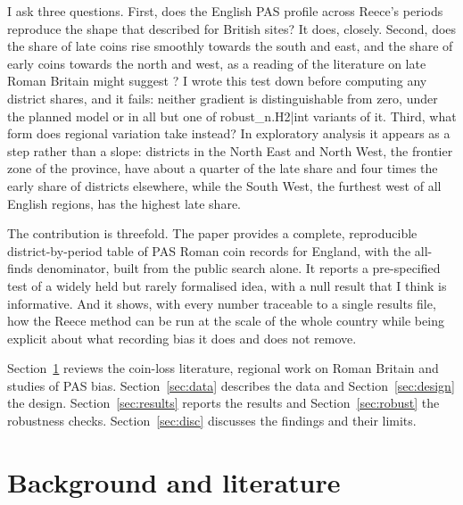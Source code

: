 \documentclass[11pt,a4paper]{article}
\begin{document}
I ask three questions. First, does the English PAS profile across Reece's periods reproduce the shape that \citet{reece1995} described for British sites? It does, closely. Second, does the share of late coins rise smoothly towards the south and east, and the share of early coins towards the north and west, as a reading of the literature on late Roman Britain might suggest \citep{esmondecleary1989,walton2012,walton2016}? I wrote this test down before computing any district shares, and it fails: neither gradient is distinguishable from zero, under the planned model or in all but one of {{robust_n.H2|int}} variants of it. Third, what form does regional variation take instead? In exploratory analysis it appears as a step rather than a slope: districts in the North East and North West, the frontier zone of the province, have about a quarter of the late share and four times the early share of districts elsewhere, while the South West, the furthest west of all English regions, has the highest late share.

The contribution is threefold. The paper provides a complete, reproducible district-by-period table of PAS Roman coin records for England, with the all-finds denominator, built from the public search alone. It reports a pre-specified test of a widely held but rarely formalised idea, with a null result that I think is informative. And it shows, with every number traceable to a single results file, how the Reece method can be run at the scale of the whole country while being explicit about what recording bias it does and does not remove.

Section~\ref{sec:lit} reviews the coin-loss literature, regional work on Roman Britain and studies of PAS bias. Section~\ref{sec:data} describes the data and Section~\ref{sec:design} the design. Section~\ref{sec:results} reports the results and Section~\ref{sec:robust} the robustness checks. Section~\ref{sec:disc} discusses the findings and their limits.

\section{Background and literature}\label{sec:lit}
\end{document}
